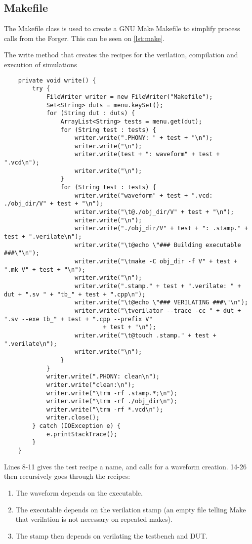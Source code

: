 \subsection{Makefile}
The Makefile class is used to create a GNU Make Makefile to simplify process calls from the Forger. This can be seen on \cref{lst:make}.
\begin{listing}
    \centering
    \caption{The write method that creates the recipes for the verilation, compilation and execution of simulations}\label{lst:make}
    \begin{verbatim}
    private void write() {
        try {
            FileWriter writer = new FileWriter("Makefile");
            Set<String> duts = menu.keySet();
            for (String dut : duts) {
                ArrayList<String> tests = menu.get(dut);
                for (String test : tests) {
                    writer.write(".PHONY: " + test + "\n");
                    writer.write("\n");
                    writer.write(test + ": waveform" + test + ".vcd\n");
                    writer.write("\n");
                }
                for (String test : tests) {
                    writer.write("waveform" + test + ".vcd: ./obj_dir/V" + test + "\n");
                    writer.write("\t@./obj_dir/V" + test + "\n");
                    writer.write("\n");
                    writer.write("./obj_dir/V" + test + ": .stamp." + test + ".verilate\n");
                    writer.write("\t@echo \"### Building executable ###\"\n");
                    writer.write("\tmake -C obj_dir -f V" + test + ".mk V" + test + "\n");
                    writer.write("\n");
                    writer.write(".stamp." + test + ".verilate: " + dut + ".sv " + "tb_" + test + ".cpp\n");
                    writer.write("\t@echo \"### VERILATING ###\"\n");
                    writer.write("\tverilator --trace -cc " + dut + ".sv --exe tb_" + test + ".cpp --prefix V"
                            + test + "\n");
                    writer.write("\t@touch .stamp." + test + ".verilate\n");
                    writer.write("\n");
                }
            }
            writer.write(".PHONY: clean\n");
            writer.write("clean:\n");
            writer.write("\trm -rf .stamp.*;\n");
            writer.write("\trm -rf ./obj_dir\n");
            writer.write("\trm -rf *.vcd\n");
            writer.close();
        } catch (IOException e) {
            e.printStackTrace();
        }
    }
    \end{verbatim}
\end{listing}
Lines 8-11 gives the test recipe a name, and calls for a waveform creation. 14-26 then recursively goes through the recipes:
\begin{enumerate}
    \item The waveform depends on the executable.
    \item The executable depends on the verilation stamp (an empty file telling Make that verilation is not necessary on repeated makes).
    \item The stamp then depends on verilating the testbench and DUT.
\end{enumerate}
